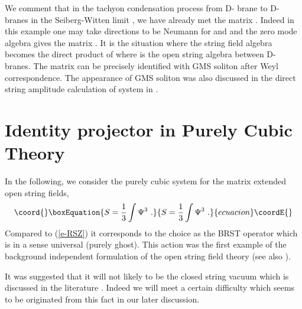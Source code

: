 \documentclass[a4paper,12pt]{article}
\begin{document}
We comment that in the tachyon condensation process from D-\coordHE{} brane
to D-\coordHE{} branes \cite{r-HKLM, r-Witten2} 
in the Seiberg-Witten limit \cite{r-SW}, we have already met
the matrix \coordHE{}.  Indeed in this example one may take
\coordHE{} directions to be Neumann for \coordHE{} and \coordHE{}
and the zero mode algebra gives the matrix \coordHE{}.
It is the situation where the string field algebra
becomes the direct product of \coordHE{}
where \myHighlight{$\cA$}\coordHE{} is the open string algebra between D-\coordHE{} branes.
The matrix \coordHE{} can be precisely 
identified with GMS soliton \cite{r-Witten2} after
Weyl correspondence.  The appearance of GMS soliton
was also discussed in the direct string amplitude calculation
of \coordHE{} system in \cite{r-CIMM}.

\section{Identity projector in Purely Cubic Theory}

In the following, we consider the purely cubic system 
for the matrix extended open string fields,
\begin{equation}\coord{}\boxEquation{\label{e-cubic}
 S=\frac{1}{3}\int \Psi^3\,\,.
}{S=\frac{1}{3}\int \Psi^3\,\,.
}{ecuacion}\coordE{}\end{equation}
Compared to (\ref{e-RSZ})
it corresponds to the choice 
\coordHE{}
as the BRST operator which is 
in a sense universal (purely ghost).
This action was the first example of the background
independent formulation of the open string field theory
\cite{r-FWY,r-HLRS} 
(see also \cite{r-HIKKO, r-HMMW, r-Romans, r-Kluson}).

It was suggested \cite{r-RSZ1} that it will not likely
to be the closed string
vacuum which is discussed in the literature
\cite{r-Vacuum, r-Ohmori}.  Indeed we will meet a certain
difficulty which seems to be originated from 
this fact in our later discussion.
\end{document}
